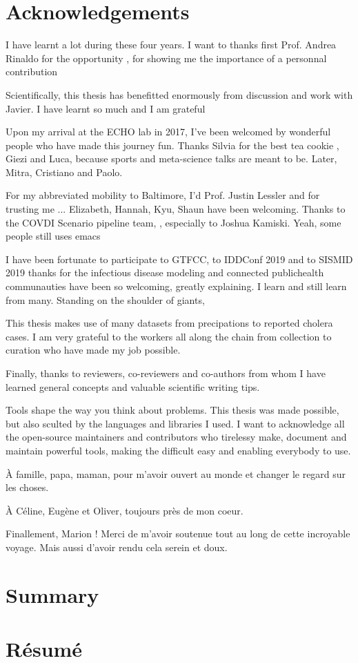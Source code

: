 


 \chapter{Acknowledgements}
 I have learnt a lot during these four years. I want to thanks first Prof. Andrea Rinaldo for the opportunity , for showing me the importance of a personnal contribution  
 
 Scientifically, this thesis has benefitted enormously from discussion and work with Javier. I have learnt so much and I am grateful
 
 Upon my arrival at the ECHO lab in 2017, I've been welcomed by wonderful people who have made this journey fun. Thanks Silvia for the best tea cookie , Giezi and Luca, because sports and meta-science talks are meant to be. Later, Mitra, Cristiano and Paolo.
 
 
 For my abbreviated mobility to Baltimore, I'd Prof. Justin Lessler and for trusting me  ... Elizabeth, Hannah, Kyu, Shaun have been welcoming. Thanks to the COVDI Scenario pipeline team, , especially to Joshua Kamiski. Yeah, some people still uses emacs
 
 I have been fortunate to participate to GTFCC, to IDDConf 2019 and to SISMID 2019 thanks for the infectious disease modeling and connected publichealth communauties have been so welcoming, greatly explaining. I learn and still learn from many. Standing on the shoulder of giants, 
 
 This thesis makes use of many datasets from precipations to reported cholera cases. I am very grateful to the workers all along the chain from collection to curation who have made my job possible.
 
 Finally, thanks to reviewers, co-reviewers and co-authors from whom I have learned general concepts and valuable scientific writing tips.
 
Tools shape the way you think about problems. This thesis was made possible, but also sculted by the languages and libraries I used. I want to acknowledge all the open-source maintainers and contributors who tirelessy make, document and maintain powerful tools, making the difficult easy and enabling everybody to use.

À famille, papa, maman, pour m'avoir ouvert au monde et changer le regard sur les choses.

À Céline, Eugène et Oliver, toujours près de mon coeur. %

Finallement, Marion ! Merci de m'avoir soutenue tout au long de cette incroyable voyage. Mais aussi d'avoir rendu cela serein et doux. 
 
 \chapter{Summary}
 
 \chapter{Résumé}